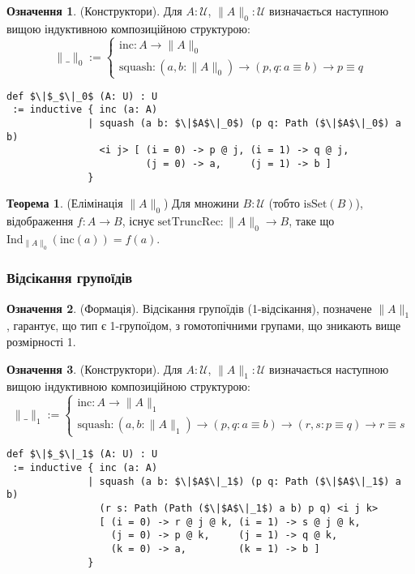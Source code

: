 \documentclass{article}
\theoremstyle{definition}
\newtheorem{theorem}{Теорема}
\newtheorem{definition}{Означення}
\begin{document}
\begin{definition} (Конструктори).
Для \( A : \mathcal{U} \), \( \| A \|_0 : \mathcal{U} \) визначається наступною вищою
індуктивною композиційною структурою:
\[
\| \_ \|_0 :=
\begin{cases}
\text{inc} : A \to \| A \|_0 \\
\text{squash} : (a, b : \| A \|_0) \to (p, q : a \equiv b) \to p \equiv q
\end{cases}
\]
\begin{lstlisting}[mathescape=true]
def $\|$_$\|_0$ (A: U) : U
 := inductive { inc (a: A)
              | squash (a b: $\|$A$\|_0$) (p q: Path ($\|$A$\|_0$) a b)
                <i j> [ (i = 0) -> p @ j, (i = 1) -> q @ j,
                        (j = 0) -> a,     (j = 1) -> b ]
              }
\end{lstlisting}
\end{definition}

\begin{theorem} (Елімінація \( \| A \|_0 \))
Для множини \( B : \mathcal{U} \) (тобто \( \text{isSet}(B) \)), відображення \( f : A \to B \),
існує \( \text{setTruncRec} : \| A \|_0 \to B \), таке що \( \text{Ind}_{\|A\|_0}(\text{inc}(a)) = f(a) \).
\end{theorem}

\subsubsection*{Відсікання групоїдів}
\begin{definition} (Формація).
Відсікання групоїдів (1-відсікання), позначене \( \| A \|_1 \), гарантує, що
тип є 1-групоїдом, з гомотопічними групами, що зникають вище розмірності 1.
\end{definition}

\begin{definition} (Конструктори).
Для \( A : \mathcal{U} \), \( \| A \|_1 : \mathcal{U} \) визначається наступною вищою
індуктивною композиційною структурою:
\[
\| \_ \|_1 :=
\begin{cases}
\text{inc} : A \to \| A \|_1 \\
\text{squash} : (a, b : \| A \|_1) \to (p, q : a \equiv b) \to (r, s : p \equiv q) \to r \equiv s
\end{cases}
\]
\begin{lstlisting}[mathescape=true]
def $\|$_$\|_1$ (A: U) : U
 := inductive { inc (a: A)
              | squash (a b: $\|$A$\|_1$) (p q: Path ($\|$A$\|_1$) a b)
                (r s: Path (Path ($\|$A$\|_1$) a b) p q) <i j k>
                [ (i = 0) -> r @ j @ k, (i = 1) -> s @ j @ k,
                  (j = 0) -> p @ k,     (j = 1) -> q @ k,
                  (k = 0) -> a,         (k = 1) -> b ]
              }
\end{lstlisting}
\end{definition}
\end{document}

